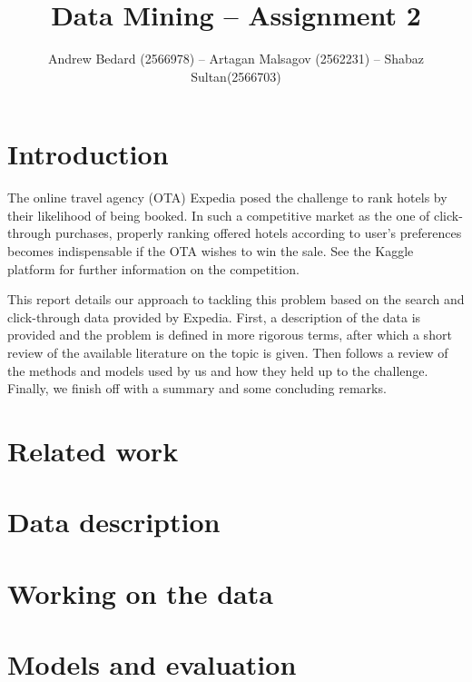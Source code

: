 \documentclass{llncs}
\title{Data Mining -- Assignment 2}
\author{Andrew Bedard (2566978) -- Artagan Malsagov (2562231)  -- Shabaz Sultan(2566703)}
\institute{}
\begin{document}
\maketitle
\section{Introduction}
The online travel agency (OTA) Expedia posed the challenge to rank hotels by their likelihood of being booked. In such a competitive market as the one of click-through purchases, properly ranking offered hotels according to user's preferences becomes indispensable if the OTA wishes to win the sale. See the Kaggle platform \cite{WinNT} for further information on the competition.

This report details our approach to tackling this problem based on the search and click-through data provided by Expedia. First, a description of the data is provided and the problem is defined in more rigorous terms, after which a short review of the available literature on the topic is given. Then follows a review of the methods and models used by us and how they held up to the challenge. Finally, we finish off with a summary and some concluding remarks.  

\section{Related work}

\section{Data description}

\section{Working on the data}

\section{Models and evaluation}




          


\end{document}
